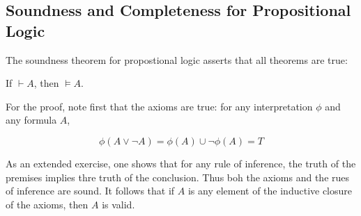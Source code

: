 \subsection{Soundness and Completeness for Propositional Logic}

The soundness theorem for propostional logic asserts that all theorems are true:

\begin{theorem}
If $\vdash A$, then $\models A$.
\end{theorem}

 For the proof, note first that the axioms are true: for any interpretation $\phi$ and any formula $A$,

$$\phi(A \lor \neg A) = \phi(A) \cup \neg \phi(A) = T$$

As an extended exercise, one shows that for any rule of inference, the truth of the premises implies thre truth of the conclusion.  Thus boh the axioms and the rues of inference are sound.  It follows that if $A$ is any element of the inductive closure of the axioms, then $A$ is valid.  










